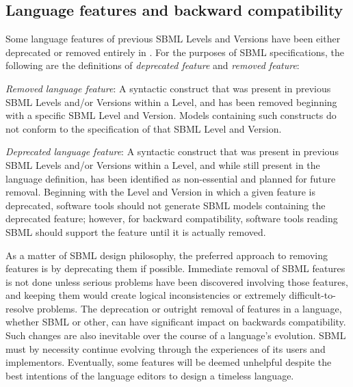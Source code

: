 \subsection{Language features and backward compatibility}
\label{sec:deprecated-features}

Some language features of previous SBML Levels and Versions have
been either deprecated or removed entirely in \changed{\sbmltwothree}.  For
the purposes of SBML specifications, the following are the
definitions of \emph{deprecated feature} and \emph{removed
  feature}:
\begin{description}
  
\item \emph{Removed language feature}: A syntactic construct that
  was present in previous SBML Levels and/or Versions within a
  Level, and has been removed beginning with a specific SBML Level
  and Version.  Models containing such constructs do not conform
  to the specification of that SBML Level and Version.
  
\item \emph{Deprecated language feature}: A syntactic construct
  that was present in previous SBML Levels and/or Versions within
  a Level, and while still present in the language definition, has
  been identified as non-essential and planned for future removal.
  Beginning with the Level and Version in which a given feature is
  deprecated, software tools should not generate SBML models
  containing the deprecated feature; however, for backward
  compatibility, software tools reading SBML should support the
  feature until it is actually removed.

\end{description}

As a matter of SBML design philosophy, the preferred approach to
removing features is by deprecating them if possible.  Immediate
removal of SBML features is not done unless serious problems have
been discovered involving those features, and keeping them would
create logical inconsistencies or extremely difficult-to-resolve
problems.  The deprecation or outright removal of features in a
language, whether SBML or other, can have significant impact on
backwards compatibility.  Such changes are also inevitable over
the course of a language's evolution.  SBML must by necessity
continue evolving through the experiences of its users and
implementors.  Eventually, some features will be deemed unhelpful
despite the best intentions of the language editors to design a
timeless language.

